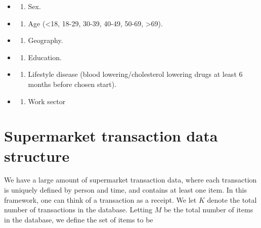 \documentclass[
  11pt,
]{article}
\providecommand{\tightlist}{%
  \setlength{\itemsep}{0pt}\setlength{\parskip}{0pt}}
\begin{document}
\begin{itemize}
\item
  \begin{enumerate}
  \def\labelenumi{\arabic{enumi})}
  \tightlist
  \item
    Sex.
  \end{enumerate}
\item
  \begin{enumerate}
  \def\labelenumi{\arabic{enumi})}
  \setcounter{enumi}{1}
  \tightlist
  \item
    Age (\textless18, 18-29, 30-39, 40-49, 50-69, \textgreater69).
  \end{enumerate}
\item
  \begin{enumerate}
  \def\labelenumi{\arabic{enumi})}
  \setcounter{enumi}{2}
  \tightlist
  \item
    Geography.
  \end{enumerate}
\item
  \begin{enumerate}
  \def\labelenumi{\arabic{enumi})}
  \setcounter{enumi}{3}
  \tightlist
  \item
    Education.
  \end{enumerate}
\item
  \begin{enumerate}
  \def\labelenumi{\arabic{enumi})}
  \setcounter{enumi}{4}
  \tightlist
  \item
    Lifestyle disease (blood lowering/cholesterol lowering drugs at
    least 6 months before chosen start).
  \end{enumerate}
\item
  \begin{enumerate}
  \def\labelenumi{\arabic{enumi})}
  \setcounter{enumi}{5}
  \tightlist
  \item
    Work sector
  \end{enumerate}
\end{itemize}

\hypertarget{supermarket-transaction-data-structure}{%
\section{Supermarket transaction data
structure}\label{supermarket-transaction-data-structure}}

We have a large amount of supermarket transaction data, where each
transaction is uniquely defined by person and time, and contains at
least one item. In this framework, one can think of a transaction as a
receipt. We let \(K\) denote the total number of transactions in the
database. Letting \(M\) be the total number of items in the database, we
define the set of items to be
\end{document}
